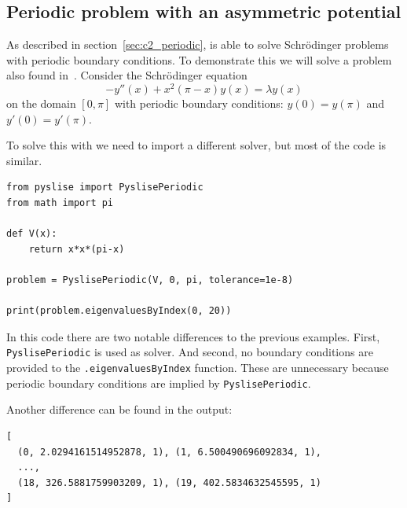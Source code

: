 \subsection{Periodic problem with an asymmetric potential}\label{sec:c2_experiments_andrew_periodic}

As described in section~\ref{sec:c2_periodic},  is able to solve Schrödinger problems with periodic boundary conditions. To demonstrate this we will solve a problem also found in~\cite{andrew_correction_1989}. Consider the Schrödinger equation
$$
    -y''(x) + x^2(\pi-x) y(x) = \lambda y(x)
$$
on the domain $[0, \pi]$ with periodic boundary conditions: $y(0) = y(\pi)$ and $y'(0) = y'(\pi)$.

To solve this with \pyslise{} we need to import a different solver, but most of the code is similar.
\begin{verbatim}
from pyslise import PyslisePeriodic
from math import pi

def V(x):
    return x*x*(pi-x)

problem = PyslisePeriodic(V, 0, pi, tolerance=1e-8)

print(problem.eigenvaluesByIndex(0, 20))
\end{verbatim}

In this code there are two notable differences to the previous examples. First, \texttt{PyslisePeriodic} is used as solver. And second, no boundary conditions are provided to the \texttt{.eigenvaluesByIndex} function. These are unnecessary because periodic boundary conditions are implied by \texttt{PyslisePeriodic}.

Another difference can be found in the output:
\begin{verbatim}
[
  (0, 2.0294161514952878, 1), (1, 6.500490696092834, 1),
  ...,
  (18, 326.5881759903209, 1), (19, 402.5834632545595, 1)
]
\end{verbatim}

